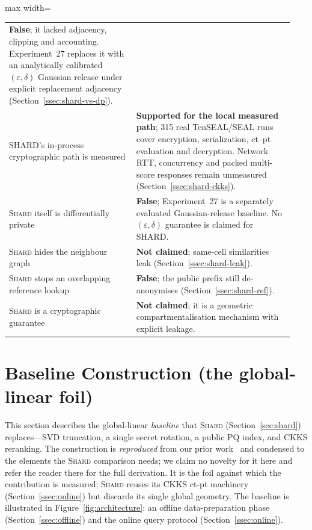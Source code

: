 \begin{table}[tbp]
\begin{singlespace}
\begin{adjustbox}{max width=\linewidth}
\begin{tabular}{@{}p{0.42\linewidth}p{0.52\linewidth}@{}}
\textbf{False}; it lacked adjacency, clipping and accounting. Experiment~27
replaces it with an analytically calibrated $(\varepsilon,\delta)$ Gaussian
release under explicit replacement adjacency
(Section~\ref{ssec:shard-vs-dp}). \\
SHARD's in-process cryptographic path is measured &
\textbf{Supported for the local measured path}; 315 real TenSEAL/SEAL runs
cover encryption, serialization, ct--pt evaluation and decryption. Network
RTT, concurrency and packed multi-score responses remain unmeasured
(Section~\ref{ssec:shard-ckks}). \\
\textsc{Shard} itself is differentially private &
\textbf{False}; Experiment~27 is a separately evaluated Gaussian-release
baseline. No $(\varepsilon,\delta)$ guarantee is claimed for SHARD. \\
\textsc{Shard} hides the neighbour graph &
\textbf{Not claimed}; same-cell similarities leak
(Section~\ref{ssec:shard-leak}). \\
\textsc{Shard} stops an overlapping reference lookup &
\textbf{False}; the public prefix still de-anonymises
(Section~\ref{ssec:shard-ref}). \\
\textsc{Shard} is a cryptographic guarantee &
\textbf{Not claimed}; it is a geometric compartmentalisation mechanism with
explicit leakage. \\
\bottomrule
\end{tabular}
\end{adjustbox}
\end{singlespace}
\end{table}

\section{Baseline Construction (the global-linear foil)}\label{sec:method}

This section describes the global-linear \emph{baseline} that
\textsc{Shard} (Section~\ref{sec:shard}) replaces---SVD truncation, a single
secret rotation, a public PQ index, and CKKS reranking. The construction is
\emph{reproduced} from our prior work~\cite{ref_vkit,ref_alpha} and condensed
to the elements the \textsc{Shard} comparison needs; we claim no novelty for
it here and refer the reader there for the full derivation. It is the foil
against which the contribution is measured; \textsc{Shard} reuses its CKKS
ct-pt machinery (Section~\ref{ssec:online}) but
discards its single global geometry. The baseline is illustrated in
Figure~\ref{fig:architecture}: an offline data-preparation phase
(Section~\ref{ssec:offline}) and the online query protocol
(Section~\ref{ssec:online}).

